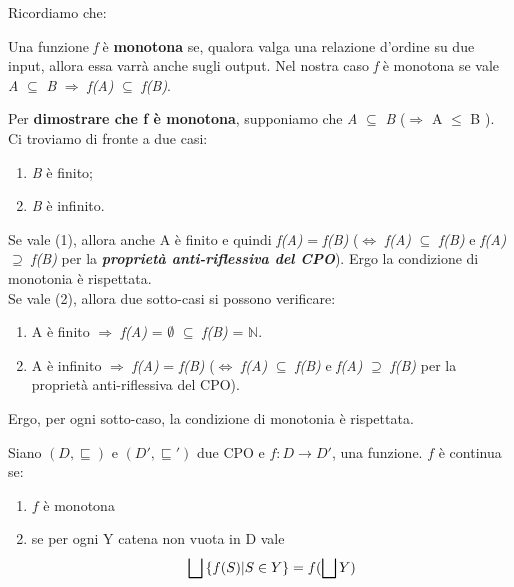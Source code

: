 {
    Ricordiamo che:
    \begin{mydef}
    Una funzione \textit{f} è \textbf{monotona} se, qualora valga una relazione
    d'ordine su due input, allora essa varrà anche sugli output. Nel nostra
    caso \textit{f} è monotona se vale \textit{A} $\subseteq$ \textit{B} 
    $\Rightarrow$ \textit{f(A)} $\subseteq$ \textit{f(B)}.
    \end{mydef}

    Per \textbf{dimostrare che f è monotona}, supponiamo che \textit{A} 
    $\subseteq$ \textit{B} ($\Rightarrow$ \textbar A\textbar{} $\leq$ \textbar B
    \textbar{}). Ci troviamo di fronte a due casi:
    \begin{enumerate}
        \item \textit{B} è finito;
        \item \textit{B} è infinito.
    \end{enumerate}

    Se vale (1), allora anche 
    \textbar A\textbar{} è finito e quindi \textit{f(A)} = \textit{f(B)} ($\iff$
    \textit{f(A)} $\subseteq$ \textit{f(B)} e \textit{f(A)} $\supseteq$ 
    \textit{f(B)} per la \textit{\textbf{proprietà anti-riflessiva del CPO}}).
    Ergo la condizione di monotonia è rispettata.\\

    Se vale (2), allora due sotto-casi si possono verificare:
    \begin{enumerate}
        \item A è finito $\Rightarrow$ \textit{f(A)} = $\emptyset$ $\subseteq$ 
        \textit{ f(B)} = $\mathbb{N}$.
        \item A è infinito $\Rightarrow$ \textit{f(A)} = \textit{f(B)} ($\iff$ 
        \textit{f(A)} $\subseteq$ \textit{f(B)} e \textit{f(A)} $\supseteq$ 
        \textit{f(B)} per la proprietà anti-riflessiva del CPO).
    \end{enumerate}

    Ergo, per ogni sotto-caso, la condizione di monotonia è rispettata.\\

    \begin{mydef}
    Siano $(D, \sqsubseteq)$ e $(D', \sqsubseteq{}')$ due CPO e 
    $f:D\rightarrow{}D'$, una funzione. $f$ è continua se:
    \begin{enumerate}
    \item $f$ è monotona
    \item se per ogni Y catena non vuota in D vale
    \[\bigsqcup{} \{f(S) | S \in{}Y\} = f(\bigsqcup{}Y)\]
    \end{enumerate}
    \end{mydef}

}
